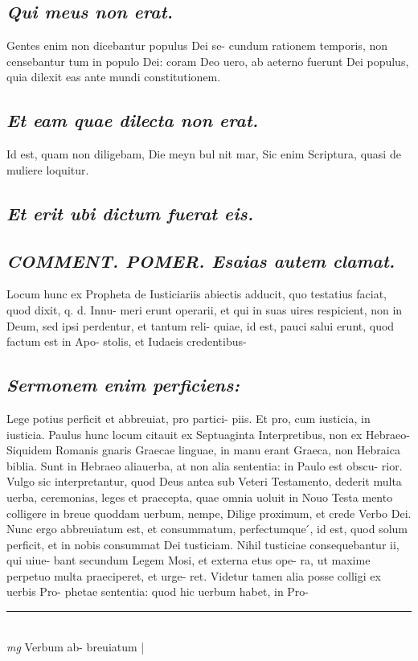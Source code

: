 \documentclass{article}
\begin{document}
\begin{pages}
\subsection*{\textit{Qui meus non erat. }}\pstart Gentes enim non dicebantur populus Dei se- cundum rationem temporis, non censebantur tum in populo Dei: coram Deo uero, ab aeterno fuerunt Dei populus, quia dilexit eas ante mundi constitutionem.   \pend
{}
{}
\subsection*{\textit{Et eam quae dilecta non erat. }}\pstart Id est, quam non diligebam, Die meyn bul nit mar, Sic enim Scriptura, quasi de muliere loquitur.  \pend
{}
{}
\subsection*{\textit{Et erit ubi dictum fuerat eis. }}
{}
\subsection*{\textit{\huge\textbf{COMMENT. POMER. }\normalsize Esaias autem clamat. }}\pstart Locum hunc ex Propheta de Iusticiariis abiectis adducit, quo testatius faciat, quod dixit, q. d. Innu- meri erunt operarii, et qui in suas uires respicient, non in Deum, sed ipsi perdentur, et tantum reli- quiae, id est, pauci salui erunt, quod factum est in Apo- stolis, et Iudaeis credentibus-  \pend
{}
{}
\subsection*{\textit{Sermonem enim perficiens: }}\pstart Lege potius perficit et abbreuiat, pro partici- piis. Et pro, cum iusticia, in iusticia. Paulus hunc locum citauit ex Septuaginta Interpretibus, non ex Hebraeo- Siquidem Romanis gnaris Graecae linguae, in manu erant Graeca, non Hebraica biblia. Sunt in Hebraeo aliauerba, at non alia sententia: in Paulo est obscu- rior. Vulgo sic interpretantur, quod Deus antea sub Veteri Testamento, dederit multa uerba, ceremonias, leges et praecepta, quae omnia uoluit in Nouo Testa mento colligere in breue quoddam uerbum, nempe, Dilige proximum, et crede Verbo Dei. Nunc ergo abbreuiatum est, et consummatum, perfectumque ́, id est, quod solum perficit, et in nobis consummat Dei tusticiam. Nihil tusticiae consequebantur ii, qui uiue- bant secundum Legem Mosi, et externa etus ope- ra, ut maxime perpetuo multa praeciperet, et urge- ret. Videtur tamen alia posse colligi ex uerbis Pro- phetae sententia: quod hic uerbum habet, in Pro-  \pend
\vspace{0.5cm}\noindent
\vspace{0.2cm}\rule{1cm}{0.2pt}\\ 
\hspace{0.2cm}\textit{mg}
\footnotesize Verbum ab- breuiatum 
\normalsize| 

\end{pages}
\end{document}
